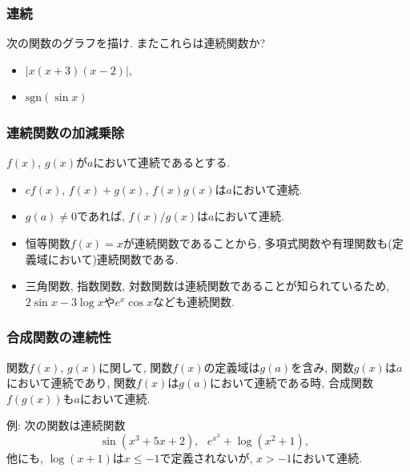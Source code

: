 

\begin{frame}
\frametitle{連続} 



\begin{Prob}
次の関数のグラフを描け. またこれらは連続関数か? 
\begin{itemize}
\item  $|x(x+3)(x-2)|$, 
\item  $\mathrm{sgn}(\sin x)$ 
\end{itemize}
\end{Prob}


\end{frame}




\begin{frame}
\frametitle{連続関数の加減乗除} 


\begin{Thm}
$f(x )$, $g(x)$が$a$において連続であるとする. 
\begin{itemize}
\item $cf(x)$, $f(x)+g(x)$, $f(x)g(x)$は$a$において連続. 
\item $g(a) \neq0$であれば, $f(x)/g(x)$は$a$において連続. 
\end{itemize}
\end{Thm}

\begin{itemize}
\item 恒等関数$f(x)=x$が連続関数であることから, 多項式関数や有理関数も(定義域において)連続関数である.  
\item 三角関数, 指数関数, 対数関数は連続関数であることが知られているため, $2\sin x -3 \log x$や$e^x \cos x$なども連続関数. 
\end{itemize}
\end{frame}




\begin{frame}
\frametitle{合成関数の連続性} 


\begin{Thm}
関数$f(x)$, $g(x)$に関して, 関数$f(x)$の定義域は$g(a)$を含み, 関数$g(x)$は$a$において連続であり, 
関数$f(x)$は$g(a)$において連続である時, 合成関数$f(g(x))$も$a$において連続. 
\end{Thm}

例: 次の関数は連続関数
$$
\sin(x^3+5x+2), \ \ \ e^{x^3}+\log(x^2+1), \ \ \ 
$$
他にも, $\log(x+1)$は$x\le-1$で定義されないが, $x>-1$において連続. 


\end{frame}



